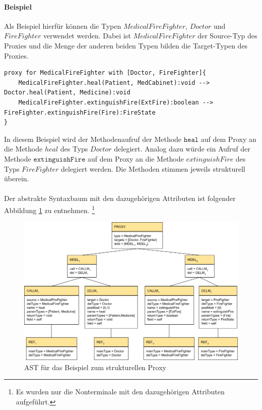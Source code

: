 \documentclass[a4paper,12pt]{article}
\begin{document}
\paragraph{Beispiel}
Als Beispiel hierfür können die Typen $MedicalFireFighter$, $Doctor$ und $FireFighter$ verwendet werden. Dabei ist $MedicalFireFighter$ der Source-Typ des Proxies und die Menge der anderen beiden Typen bilden die Target-Typen des Proxies.
\begin{lstlisting}[style = dsl]
proxy for MedicalFireFighter with [Doctor, FireFighter]{
	MedicalFireFighter.heal(Patient, MedCabinet):void --> Doctor.heal(Patient, Medicine):void
	MedicalFireFighter.extinguishFire(ExtFire):boolean --> FireFighter.extinguishFire(Fire):FireState
}
\end{lstlisting}
In diesem Beispiel wird der Methodenaufruf der Methode $\texttt{heal}$ auf dem Proxy an die Methode $heal$ des Typs $Doctor$ delegiert. Analog dazu würde ein Aufruf der Methode $\texttt{extinguishFire}$ auf dem Proxy an die Methode $extinguishFire$ des Typs $FireFighter$ delegiert werden. Die Methoden stimmen jeweils strukturell überein.\\\\
Der abstrakte Syntaxbaum mit den dazugehörigen Attributen ist folgender Abbildung \ref{fig:ASTSTRUCT} zu entnehmen. \footnote{Es wurden nur die Nonterminale mit den dazugehörigen Attributen aufgeführt.}
\begin{figure}[h!]
\centering
\includegraphics[width=\linewidth]{AST_StructExample}
\caption{AST für das Beispiel zum strukturellen Proxy}
\label{fig:ASTSTRUCT}
\end{figure}
\noindent
\end{document}
